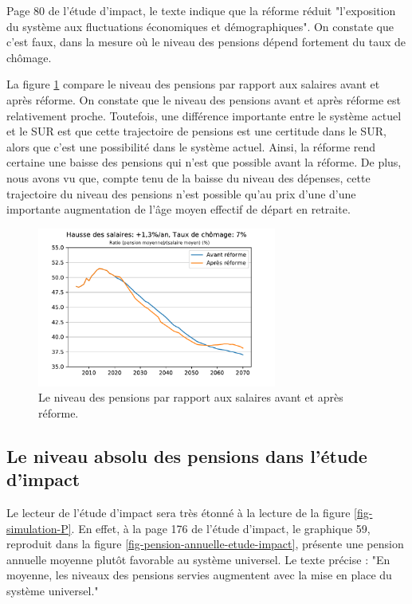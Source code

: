 \documentclass[10pt]{article}
\begin{document}
Page 80 de l'étude d'impact, le texte indique que la réforme 
réduit "l’exposition du système aux fluctuations économiques et démographiques". 
On constate que c'est faux, dans la mesure où le niveau des pensions 
dépend fortement du taux de chômage.

La figure \ref{fig-simulation-P-vs-COR} compare le niveau des pensions par rapport 
aux salaires avant et après réforme. 
On constate que le niveau des pensions avant et après réforme est 
relativement proche. 
Toutefois, une différence importante entre le système actuel 
et le SUR est que cette trajectoire de pensions est une certitude dans le SUR, 
alors que c'est une possibilité dans le système actuel. 
Ainsi, la réforme rend certaine une baisse des pensions qui n'est que 
possible avant la réforme. 
De plus, nous avons vu que, compte tenu de la baisse du niveau des dépenses, 
cette trajectoire du niveau des pensions n'est possible qu'au prix d'une 
d'une importante augmentation de l'âge moyen effectif de départ en retraite. 

\begin{figure}
\begin{center}
\includegraphics[width=0.7\textwidth]{Simulation-vs-avant-reforme-Pensions.pdf}
\end{center}
\caption{Le niveau des pensions par rapport aux salaires 
avant et après réforme.}
\label{fig-simulation-P-vs-COR}
\end{figure}


\subsection{Le niveau absolu des pensions dans l'étude d'impact}

Le lecteur de l'étude d'impact sera très étonné à la lecture de la figure 
\ref{fig-simulation-P}. 
En effet, à la page 176 de l'étude d'impact, le graphique 59, 
reproduit dans la figure \ref{fig-pension-annuelle-etude-impact}, 
présente une pension annuelle moyenne plutôt favorable au système 
universel.
Le texte précise : "En moyenne, les niveaux des pensions servies augmentent 
avec la mise en place du système universel."
\end{document}
